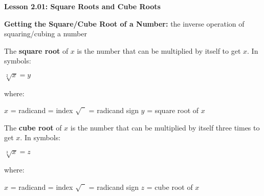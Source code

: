 \begin{center}
\textbf{Lesson 2.01: Square Roots and Cube Roots}
\end{center}

\vspace*{-1.5ex}

\textbf{Getting the Square/Cube Root of a Number:} the inverse operation of squaring/cubing a number

The \textbf{square root} of \(x\) is the number that can be multiplied by itself to get \(x\). In symbols: 

{\centering $ \sqrt[{\scriptstyle 2}]{x} = y $\par}

where: 

\(x\) = radicand  = index \quad \(\sqrt{\phantom{5}}\) = radicand sign \quad \(y\) = square root of \(x\) 

 The \textbf{cube root} of \(x\) is the number that can be multiplied by itself three times to get \(x\). In symbols: 

 {\centering $ \sqrt[{\scriptstyle 3}]{x} = z $\par}
 
 where:

 \(x\) = radicand  = index \quad \(\sqrt{\phantom{5}}\) = radicand sign \quad \(z\) = cube root of \(x\) 

